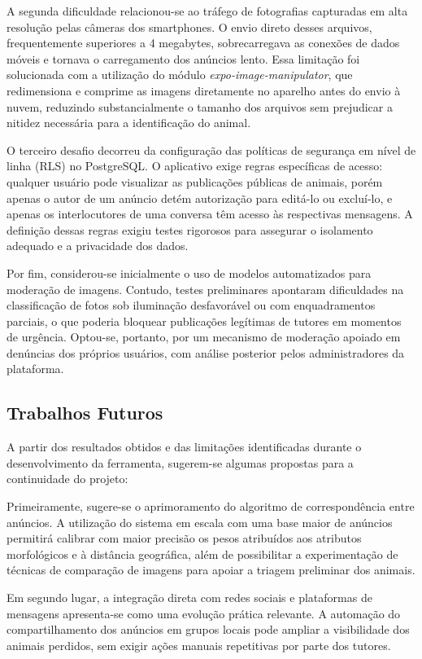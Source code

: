 A segunda dificuldade relacionou-se ao tráfego de fotografias capturadas em alta resolução pelas câmeras dos smartphones. O envio direto desses arquivos, frequentemente superiores a 4 megabytes, sobrecarregava as conexões de dados móveis e tornava o carregamento dos anúncios lento. Essa limitação foi solucionada com a utilização do módulo \textit{expo-image-manipulator}, que redimensiona e comprime as imagens diretamente no aparelho antes do envio à nuvem, reduzindo substancialmente o tamanho dos arquivos sem prejudicar a nitidez necessária para a identificação do animal.

O terceiro desafio decorreu da configuração das políticas de segurança em nível de linha (RLS) no PostgreSQL. O aplicativo exige regras específicas de acesso: qualquer usuário pode visualizar as publicações públicas de animais, porém apenas o autor de um anúncio detém autorização para editá-lo ou excluí-lo, e apenas os interlocutores de uma conversa têm acesso às respectivas mensagens. A definição dessas regras exigiu testes rigorosos para assegurar o isolamento adequado e a privacidade dos dados.

Por fim, considerou-se inicialmente o uso de modelos automatizados para moderação de imagens. Contudo, testes preliminares apontaram dificuldades na classificação de fotos sob iluminação desfavorável ou com enquadramentos parciais, o que poderia bloquear publicações legítimas de tutores em momentos de urgência. Optou-se, portanto, por um mecanismo de moderação apoiado em denúncias dos próprios usuários, com análise posterior pelos administradores da plataforma.


\subsection{Trabalhos Futuros}

A partir dos resultados obtidos e das limitações identificadas durante o desenvolvimento da ferramenta, sugerem-se algumas propostas para a continuidade do projeto:

Primeiramente, sugere-se o aprimoramento do algoritmo de correspondência entre anúncios. A utilização do sistema em escala com uma base maior de anúncios permitirá calibrar com maior precisão os pesos atribuídos aos atributos morfológicos e à distância geográfica, além de possibilitar a experimentação de técnicas de comparação de imagens para apoiar a triagem preliminar dos animais.

Em segundo lugar, a integração direta com redes sociais e plataformas de mensagens apresenta-se como uma evolução prática relevante. A automação do compartilhamento dos anúncios em grupos locais pode ampliar a visibilidade dos animais perdidos, sem exigir ações manuais repetitivas por parte dos tutores.

